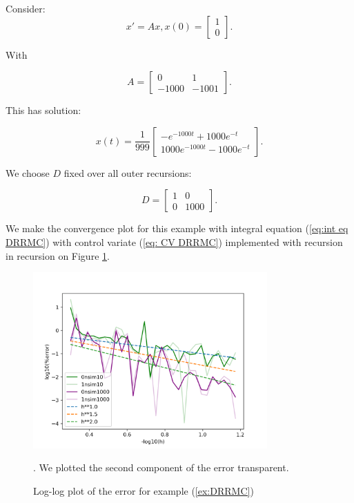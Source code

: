 \documentclass[a4paper,12pt]{article}
\begin{document}
\begin{example}[DRRMC] \label{ex:DRRMC}
    Consider:
    \begin{equation}
        x'= Ax, x(0)=
        \begin{bmatrix}
            1 \\
            0
        \end{bmatrix}.
    \end{equation}

    With

    \begin{equation}
        A = \begin{bmatrix}
            0     & 1     \\
            -1000 & -1001
        \end{bmatrix}.
    \end{equation}

    This has solution:

    \begin{equation}
        x(t) = \frac{1}{999}
        \begin{bmatrix}
            -  e^{-1000t}+ 1000 e^{-t} \\
            1000 e^{-1000t}- 1000e^{-t}
        \end{bmatrix}.
    \end{equation}

    We choose $D$ fixed over all outer recursions:

    \begin{equation}
        D = \begin{bmatrix}
            1 & 0    \\
            0 & 1000
        \end{bmatrix}.
    \end{equation}

    We make the convergence plot for this example with
    integral equation  (\ref{eq:int eq DRRMC}) with control variate
    (\ref{eq: CV DRRMC}) implemented with recursion in recursion
    on Figure \ref{fig:DRRMC}.

    \begin{figure}[ht!]
        \centering
        \includegraphics[width=0.8\textwidth]{plots/DRRMC.png}
        \caption{Log-log plot of the error for example (\ref{ex:DRRMC})}. We plotted
        the second component of the error transparent.
        \label{fig:DRRMC}
    \end{figure}


\end{example}
\end{document}
